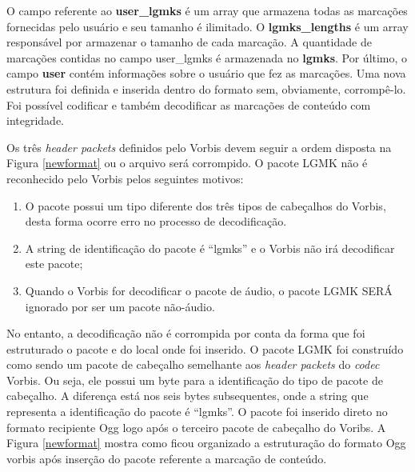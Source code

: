 O campo referente ao \textbf{user\_lgmks} é um array que armazena todas as marcações fornecidas pelo usuário e seu tamanho é ilimitado. O \textbf{lgmks\_lengths} é um array responsável por armazenar o tamanho de cada marcação. A quantidade de marcações contidas no campo user\_lgmks é armazenada no \textbf{lgmks}. Por último, o campo \textbf{user} contém informações sobre o usuário que fez as marcações. Uma nova estrutura foi definida e inserida dentro do formato sem, obviamente, corrompê-lo. Foi possível codificar e também decodificar as marcações de conteúdo com integridade.

Os três \textit{header packets} definidos pelo Vorbis devem seguir a ordem disposta na Figura \ref{newformat} ou o arquivo será corrompido. O pacote LGMK não é reconhecido pelo Vorbis pelos seguintes motivos:

\begin{enumerate}
	\item O pacote possui um tipo diferente dos três tipos de cabeçalhos do Vorbis, desta forma ocorre erro no processo de decodificação.
	\item A string de identificação do pacote é ``lgmks'' e o Vorbis não irá decodificar este pacote;
	\item Quando o Vorbis for decodificar o pacote de áudio, o pacote LGMK SERÁ ignorado por ser um pacote não-áudio.
\end{enumerate}

 No entanto, a decodificação não é corrompida por conta da forma que foi estruturado o pacote e do local onde foi inserido. O pacote LGMK foi construído como sendo um pacote de cabeçalho semelhante aos \textit{header packets} do \textit{codec} Vorbis. Ou seja, ele possui um byte para a identificação do tipo de pacote de cabeçalho. A diferença está nos seis bytes subsequentes, onde a string que representa a identificação do pacote é ``lgmks''. O pacote foi inserido direto no formato recipiente Ogg logo após o terceiro pacote de cabeçalho do Voribs. A Figura \ref{newformat} mostra como ficou organizado a estruturação do formato Ogg vorbis após inserção do pacote referente a marcação de conteúdo.

